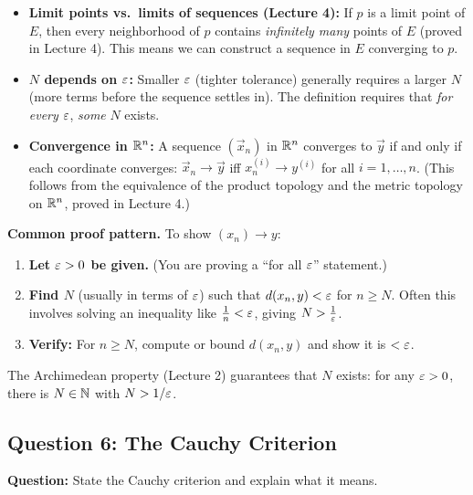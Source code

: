 \documentclass[../master/master.tex]{subfiles}
\begin{document}
\begin{itemize}
    \item \textbf{Limit points vs.\ limits of sequences (Lecture 4):} If $p$ is a limit point of $E$, then every neighborhood of $p$ contains \emph{infinitely many} points of $E$ (proved in Lecture 4). This means we can construct a sequence in $E$ converging to $p$.

    \item \textbf{$N$ depends on $\varepsilon$:} Smaller $\varepsilon$ (tighter tolerance) generally requires a larger $N$ (more terms before the sequence settles in). The definition requires that \emph{for every} $\varepsilon$, \emph{some} $N$ exists.

    \item \textbf{Convergence in $\mathbb{R}^n$:} A sequence $(\vec{x}_n)$ in $\mathbb{R}^n$ converges to $\vec{y}$ if and only if each coordinate converges: $\vec{x}_n \to \vec{y}$ iff $x_n^{(i)} \to y^{(i)}$ for all $i = 1, \ldots, n$. (This follows from the equivalence of the product topology and the metric topology on $\mathbb{R}^n$, proved in Lecture 4.)
\end{itemize}

\begin{notebox}
\textbf{Common proof pattern.} To show $(x_n) \to y$:
\begin{enumerate}
    \item \textbf{Let $\varepsilon > 0$ be given.} (You are proving a ``for all $\varepsilon$'' statement.)
    \item \textbf{Find $N$} (usually in terms of $\varepsilon$) such that $d(x_n, y) < \varepsilon$ for $n \geq N$. Often this involves solving an inequality like $\frac{1}{n} < \varepsilon$, giving $N > \frac{1}{\varepsilon}$.
    \item \textbf{Verify:} For $n \geq N$, compute or bound $d(x_n, y)$ and show it is $< \varepsilon$.
\end{enumerate}

The Archimedean property (Lecture 2) guarantees that $N$ exists: for any $\varepsilon > 0$, there is $N \in \mathbb{N}$ with $N > 1/\varepsilon$.
\end{notebox}

\newpage
\subsection{Question 6: The Cauchy Criterion}

\begin{summarybox}
\textbf{Question:} State the Cauchy criterion and explain what it means.
\end{summarybox}
\end{document}
